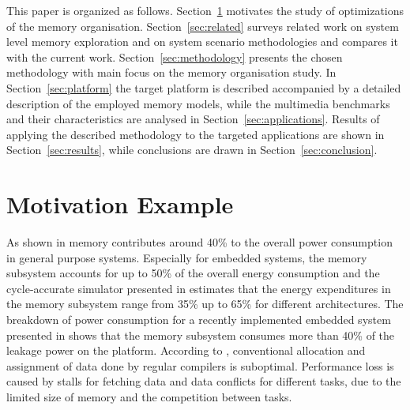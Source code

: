 \documentclass[a4paper,conference]{IEEEtran}
\begin{document}

This paper is organized as follows. Section~\ref{sec:motivation} motivates the study of optimizations of the memory organisation. Section~\ref{sec:related} surveys related work on system level memory exploration and on system scenario methodologies and compares it with the current work. Section~\ref{sec:methodology} presents the chosen methodology with main focus on the memory organisation study. In Section~\ref{sec:platform} the target platform is described accompanied by a detailed description of the employed memory models, while the multimedia benchmarks and their characteristics are analysed in Section~\ref{sec:applications}. Results of applying the described methodology to the targeted applications are shown in Section~\ref{sec:results}, while conclusions are drawn in Section~\ref{sec:conclusion}. 

\section{Motivation Example}
\label{sec:motivation}

As shown in \cite{Gonzalez1996} memory contributes around 40\% to the overall power consumption in general purpose systems. Especially for embedded systems, the memory subsystem accounts for up to 50\% of the overall energy consumption \cite{Che09} and the cycle-accurate simulator presented in \cite{Ben99} estimates that the energy expenditures in the memory subsystem range from 35\% up to 65\% for different architectures. The breakdown of power consumption for a recently implemented embedded system presented in \cite{Hul11} shows that the memory subsystem consumes more than 40\% of the leakage power on the platform. According to \cite{tcm}, conventional allocation and assignment of data done by regular compilers is suboptimal. Performance loss is caused by stalls for fetching data and data conflicts for different tasks, due to the limited size of memory and the competition between tasks. 
\end{document}
